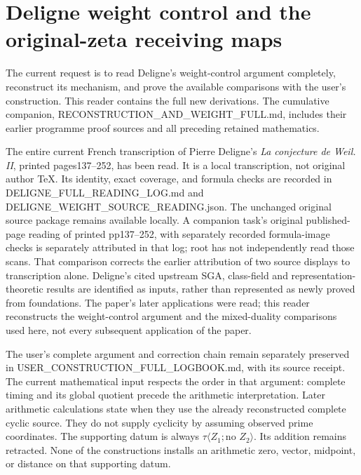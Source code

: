 \documentclass[
]{report}
\author{}
\date{}
\begin{document}
{
\setcounter{tocdepth}{2}
\tableofcontents
}
\chapter{Deligne weight control and the original-zeta receiving
maps}\label{deligne-weight-control-and-the-original-zeta-receiving-maps}

The current request is to read Deligne's weight-control argument
completely, reconstruct its mechanism, and prove the available
comparisons with the user's construction. This reader contains the full
new derivations. The cumulative companion,
RECONSTRUCTION\_AND\_WEIGHT\_FULL.md, includes their earlier programme
proof sources and all preceding retained mathematics.

The entire current French transcription of Pierre Deligne's \emph{La
conjecture de Weil. II}, printed pages137--252, has been read. It is a
local transcription, not original author TeX. Its identity, exact
coverage, and formula checks are recorded in
DELIGNE\_FULL\_READING\_LOG.md and
DELIGNE\_WEIGHT\_SOURCE\_READING.json. The unchanged original source
package remains available locally. A companion task's original
published-page reading of printed pp137--252, with separately recorded
formula-image checks is separately attributed in that log; root has not
independently read those scans. That comparison corrects the earlier
attribution of two source displays to transcription alone. Deligne's
cited upstream SGA, class-field and representation-theoretic results are
identified as inputs, rather than represented as newly proved from
foundations. The paper's later applications were read; this reader
reconstructs the weight-control argument and the mixed-duality
comparisons used here, not every subsequent application of the paper.

The user's complete argument and correction chain remain separately
preserved in USER\_CONSTRUCTION\_FULL\_LOGBOOK.md, with its source
receipt. The current mathematical input respects the order in that
argument: complete timing and its global quotient precede the arithmetic
interpretation. Later arithmetic calculations state when they use the
already reconstructed complete cyclic source. They do not supply
cyclicity by assuming observed prime coordinates. The supporting datum
is always \(\tau\langle Z_1;\text{no }Z_2\rangle\). Its addition remains
retracted. None of the constructions installs an arithmetic zero,
vector, midpoint, or distance on that supporting datum.
\end{document}
